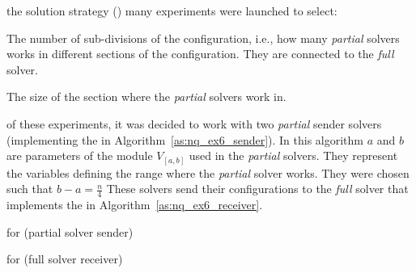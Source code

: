  the solution strategy (\as) many experiments were launched to select: \begin{inparaenum} \item The number of sub-divisions of the configuration, i.e., how many {\it partial} solvers works in different sections of the configuration. They are connected to the {\it full} solver. \item The size of the section where the {\it partial} solvers work in. \end{inparaenum} 

 of these experiments, it was decided to work with two {\it partial} sender solvers (implementing the \as{} in Algorithm~\ref{as:nq_ex6_sender}). In this algorithm $a$ and $b$ are parameters of the module $V_{[a,b]}$ used in the {\it partial} solvers. They represent the variables defining the range where the {\it partial} solver works. They were chosen such that $b-a = \tfrac{n}{4}$ These solvers send their configurations to the {\it full} solver that implements the \as{} in Algorithm~\ref{as:nq_ex6_receiver}.

\begin{algorithm}[H]
\dontprintsemicolon
\SetNoline
{}
\caption{\As{} for \NQP{} (partial solver sender)}\label{as:nq_ex6_sender}
\end{algorithm}

\begin{algorithm}[H]
\dontprintsemicolon
\SetNoline
{}
\caption{\As{} for \NQP{} (full solver receiver)}\label{as:nq_ex6_receiver}
\end{algorithm}

